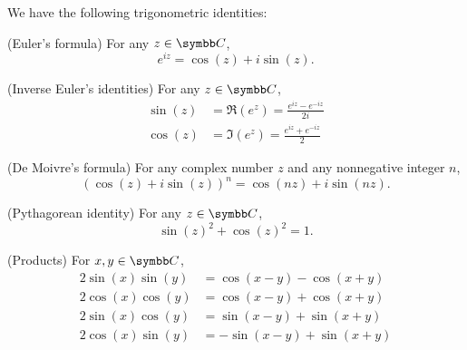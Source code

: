 \begin{proposition}\label{thm:trigonometric_identities}
  We have the following trigonometric identities:
  \begin{propenum}
     (Euler's formula) For any \( z \in \BC \),
    \begin{equation}\label{thm:trigonometric_identities/eulers_formula/identity}
      e^{iz} = \cos(z) + i \sin(z).
    \end{equation}

     (Inverse Euler's identities) For any \( z \in \BC \),
    \begin{align}
       \sin(z) &= \Re(e^z) = \frac {e^{iz} - e^{-iz}} {2i} \label{thm:trigonometric_identities/inverse_euler/sin} \\
       \cos(z) &= \Im(e^z) = \frac {e^{iz} + e^{-iz}} 2 \label{thm:trigonometric_identities/inverse_euler/cos}
    \end{align}

     (De Moivre's formula) For any complex number \( z \) and any nonnegative integer \( n \),
    \begin{equation}\label{thm:trigonometric_identities/de_moivre/identity}
      (\cos(z) + i \sin(z))^n = \cos(nz) + i \sin(nz).
    \end{equation}

     (Pythagorean identity) For any \( z \in \BC \),
    \begin{equation}\label{thm:trigonometric_identities/pythagorean/identity}
      \sin(z)^2 + \cos(z)^2 = 1.
    \end{equation}

     (Products) For \( x, y \in \BC \),
    \begin{align}
      2 \sin(x) \sin(y) &= \cos(x - y) - \cos(x + y) \label{thm:trigonometric_identities/products/ss} \\
      2 \cos(x) \cos(y) &= \cos(x - y) + \cos(x + y) \label{thm:trigonometric_identities/products/cc} \\
      2 \sin(x) \cos(y) &= \sin(x - y) + \sin(x + y) \label{thm:trigonometric_identities/products/sc} \\
      2 \cos(x) \sin(y) &= -\sin(x - y) + \sin(x + y) \label{thm:trigonometric_identities/products/cs}
    \end{align}


\end{propenum}
\end{proposition}
